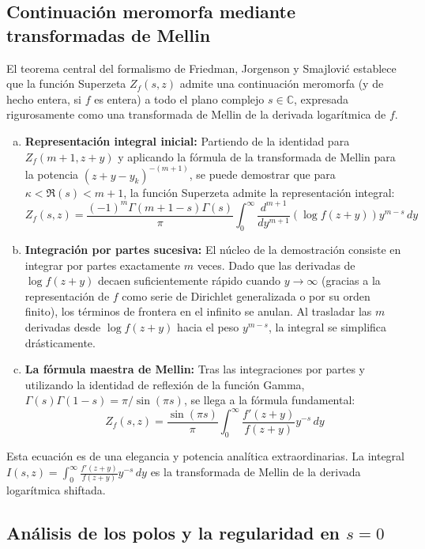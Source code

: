 \subsection{Continuación meromorfa mediante transformadas de Mellin}

El teorema central del formalismo de Friedman, Jorgenson y Smajlović establece que la función Superzeta $Z_f(s, z)$ admite una continuación meromorfa (y de hecho entera, si $f$ es entera) a todo el plano complejo $s \in \mathbb{C}$, expresada rigurosamente como una transformada de Mellin de la derivada logarítmica de $f$.

\begin{enumerate}[a)]
    \item \textbf{Representación integral inicial:} Partiendo de la identidad para $Z_f(m+1, z+y)$ y aplicando la fórmula de la transformada de Mellin para la potencia $(z+y-y_k)^{-(m+1)}$, se puede demostrar que para $\kappa < \Re(s) < m+1$, la función Superzeta admite la representación integral:
    $$ Z_f(s, z) = \frac{(-1)^m \Gamma(m+1-s)\Gamma(s)}{\pi} \int_0^{\infty} \frac{d^{m+1}}{dy^{m+1}} (\log f(z+y)) y^{m-s} \, dy $$
    
    \item \textbf{Integración por partes sucesiva:} El núcleo de la demostración consiste en integrar por partes exactamente $m$ veces. Dado que las derivadas de $\log f(z+y)$ decaen suficientemente rápido cuando $y \to \infty$ (gracias a la representación de $f$ como serie de Dirichlet generalizada o por su orden finito), los términos de frontera en el infinito se anulan. Al trasladar las $m$ derivadas desde $\log f(z+y)$ hacia el peso $y^{m-s}$, la integral se simplifica drásticamente.
    
    \item \textbf{La fórmula maestra de Mellin:} Tras las integraciones por partes y utilizando la identidad de reflexión de la función Gamma, $\Gamma(s)\Gamma(1-s) = \pi / \sin(\pi s)$, se llega a la fórmula fundamental:
    $$ Z_f(s, z) = \frac{\sin(\pi s)}{\pi} \int_0^{\infty} \frac{f'(z+y)}{f(z+y)} y^{-s} \, dy $$
\end{enumerate}

Esta ecuación es de una elegancia y potencia analítica extraordinarias. La integral $I(s, z) = \int_0^{\infty} \frac{f'(z+y)}{f(z+y)} y^{-s} \, dy$ es la transformada de Mellin de la derivada logarítmica shiftada. 

\subsection{Análisis de los polos y la regularidad en $s=0$}

